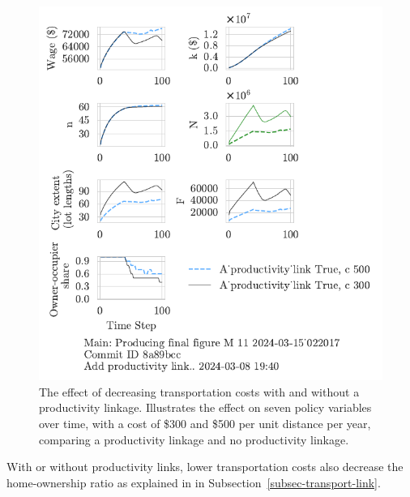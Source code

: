 \begin{figure}[h!tb]
    \includegraphics[scale=.75, trim={0 1.4cm 2.3cm 0},clip]{fig/With-productivity_link-c-15_022017.pdf} 
    \caption[The effect of decreasing transportation costs with and without a productivity linkage]{The effect of decreasing transportation costs with and without a productivity linkage. Illustrates the effect on seven policy variables over time, with a cost of \$300 and \$500  per unit distance per year, comparing a productivity linkage and no productivity linkage.}
    \label{fig:Productivity_link_W-WO-transportation-cost}
\end{figure}
With or without productivity links, lower transportation costs also decrease the home-ownership ratio as explained in in Subsection~\ref{subsec-transport-link}. 




\newpage


